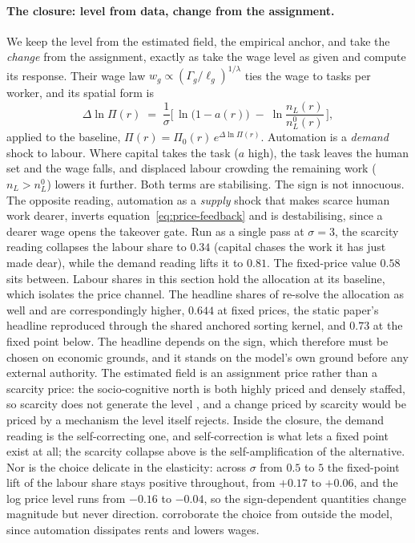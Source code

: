 \documentclass[12pt, a4paper]{article}
\begin{document}
\paragraph{The closure: level from data, change from the assignment.}
We keep the level from the estimated field, the empirical anchor, and
take the \emph{change} from the assignment, exactly as
\textcite{acemoglu2024rents} take the wage level as given and compute
its response. Their wage law
$w_g \propto (\Gamma_g/\ell_g)^{1/\lambda}$ ties the wage to tasks per
worker, and its spatial form is
\begin{equation}
  \Delta \ln \Pi(r) \;=\; \frac{1}{\sigma}\Big[\,\ln\big(1-a(r)\big) \;-\; \ln\frac{n_L(r)}{n_L^0(r)}\,\Big],
  \label{eq:price-feedback}
\end{equation}
applied to the baseline, $\Pi(r) = \Pi_0(r)\,e^{\Delta\ln\Pi(r)}$.
Automation is a \emph{demand} shock to labour. Where capital takes the
task ($a$ high), the task leaves the human set and the wage falls, and
displaced labour crowding the remaining work ($n_L > n_L^0$) lowers it
further. Both terms are stabilising. The sign is not innocuous. The
opposite reading, automation as a \emph{supply} shock that makes scarce
human work dearer, inverts equation~\eqref{eq:price-feedback} and is
destabilising, since a dearer wage opens the takeover gate. Run as a
single pass at $\sigma = 3$, the scarcity reading collapses the labour
share to $0.34$ (capital chases the work it has just made dear), while
the demand reading lifts it to $0.81$. The fixed-price value $0.58$
sits between. Labour shares in this section hold the allocation at
its baseline, which isolates the price channel. The headline shares of
\textcite{storck2026fields} re-solve the allocation as well and are
correspondingly higher, $0.644$ at fixed prices, the static paper's
headline reproduced through the shared anchored sorting kernel, and
$0.73$ at the fixed point below. The headline depends on the sign, which therefore must be
chosen on economic grounds, and it stands on the model's own ground
before any external authority. The estimated field is an assignment
price rather than a scarcity price: the socio-cognitive north is both
highly priced and densely staffed, so scarcity does not generate the
level \parencite{storck2026fields}, and a change priced by scarcity
would be priced by a mechanism the level itself rejects. Inside the
closure, the demand reading is the self-correcting one, and
self-correction is what lets a fixed point exist at all; the scarcity
collapse above is the self-amplification of the alternative. Nor is the
choice delicate in the elasticity: across $\sigma$ from $0.5$ to $5$
the fixed-point lift of the labour share stays positive throughout,
from $+0.17$ to $+0.06$, and the log price level runs from $-0.16$ to
$-0.04$, so the sign-dependent quantities change magnitude but never
direction.
\textcite{acemoglu2024rents} corroborate the choice from outside the
model, since automation dissipates rents and lowers wages.
\end{document}
